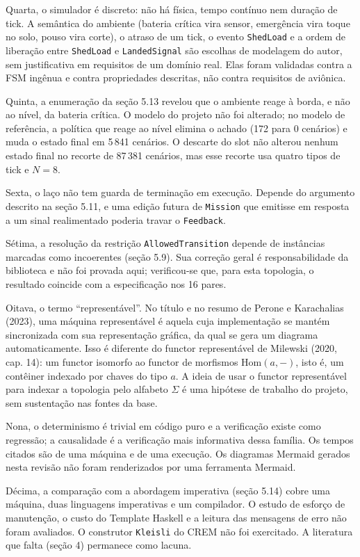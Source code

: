 \documentclass[12pt,a4paper]{article}
\begin{document}
Quarta, o simulador é discreto: não há física, tempo contínuo nem duração de tick. A semântica do ambiente (bateria crítica vira sensor, emergência vira toque no solo, pouso vira corte), o atraso de um tick, o evento \texttt{ShedLoad} e a ordem de liberação entre \texttt{ShedLoad} e \texttt{LandedSignal} são escolhas de modelagem do autor, sem justificativa em requisitos de um domínio real. Elas foram validadas contra a FSM ingênua e contra propriedades descritas, não contra requisitos de aviônica.

Quinta, a enumeração da seção 5.13 revelou que o ambiente reage à borda, e não ao nível, da bateria crítica. O modelo do projeto não foi alterado; no modelo de referência, a política que reage ao nível elimina o achado (172 para 0 cenários) e muda o estado final em 5\,841 cenários. O descarte do slot não alterou nenhum estado final no recorte de 87\,381 cenários, mas esse recorte usa quatro tipos de tick e $N = 8$.

Sexta, o laço não tem guarda de terminação em execução. Depende do argumento descrito na seção 5.11, e uma edição futura de \texttt{Mission} que emitisse em resposta a um sinal realimentado poderia travar o \texttt{Feedback}.

Sétima, a resolução da restrição \texttt{AllowedTransition} depende de instâncias marcadas como incoerentes (seção 5.9). Sua correção geral é responsabilidade da biblioteca e não foi provada aqui; verificou-se que, para esta topologia, o resultado coincide com a especificação nos 16 pares.

Oitava, o termo ``representável''. No título e no resumo de Perone e Karachalias (2023), uma máquina representável é aquela cuja implementação se mantém sincronizada com sua representação gráfica, da qual se gera um diagrama automaticamente. Isso é diferente do functor representável de Milewski (2020, cap. 14): um functor isomorfo ao functor de morfismos $\mathrm{Hom}(a, -)$, isto é, um contêiner indexado por chaves do tipo $a$. A ideia de usar o functor representável para indexar a topologia pelo alfabeto $\Sigma$ é uma hipótese de trabalho do projeto, sem sustentação nas fontes da base.

Nona, o determinismo é trivial em código puro e a verificação existe como regressão; a causalidade é a verificação mais informativa dessa família. Os tempos citados são de uma máquina e de uma execução. Os diagramas Mermaid gerados nesta revisão não foram renderizados por uma ferramenta Mermaid.

Décima, a comparação com a abordagem imperativa (seção 5.14) cobre uma máquina, duas linguagens imperativas e um compilador. O estudo de esforço de manutenção, o custo do Template Haskell e a leitura das mensagens de erro não foram avaliados. O construtor \texttt{Kleisli} do CREM não foi exercitado. A literatura que falta (seção 4) permanece como lacuna.
\end{document}
